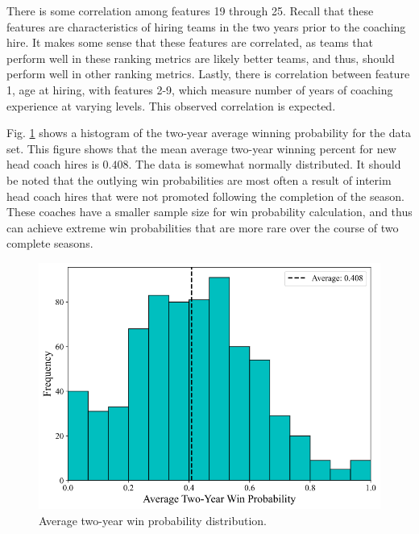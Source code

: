 \documentclass[conference]{IEEEtran}
\begin{document}
There is some correlation among features 19 through 25. Recall that these features are characteristics of hiring teams in the two years prior to the coaching hire. It makes some sense that these features are correlated, as teams that perform well in these ranking metrics are likely better teams, and thus, should perform well in other ranking metrics. Lastly, there is correlation between feature 1, age at hiring, with features 2-9, which measure number of years of coaching experience at varying levels. This observed correlation is expected. 

Fig. \ref{fig2} shows a histogram of the two-year average winning probability for the data set. This figure shows that the mean average two-year winning percent for new head coach hires is $0.408$. The data is somewhat normally distributed. It should be noted that the outlying win probabilities are most often a result of interim head coach hires that were not promoted following the completion of the season. These coaches have a smaller sample size for win probability calculation, and thus can achieve extreme win probabilities that are more rare over the course of two complete seasons. 

\begin{figure}[htbp]
\centerline{\includegraphics[width=1\linewidth]{hist1.png}}
\caption{Average two-year win probability distribution.}
\label{fig2}
\end{figure}
\end{document}
